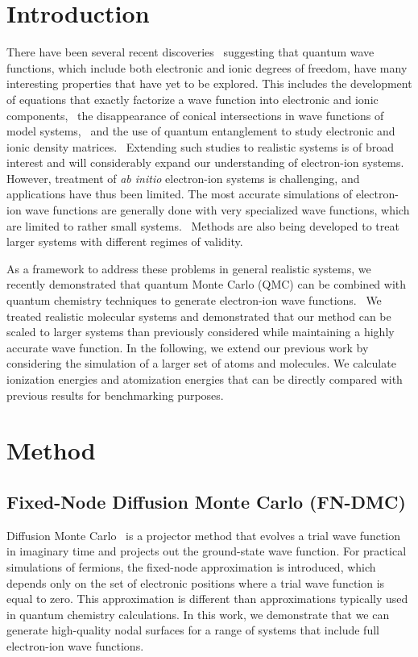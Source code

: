 \section{Introduction}
There have been several recent discoveries~\cite{Tubman_ECG,cederbaum1,gross2014,boent,Martinez_Review} suggesting that quantum wave functions, which include both electronic and ionic degrees of freedom, have many interesting properties that have yet to be explored.  This includes the development of equations that exactly factorize a wave function into electronic and ionic components,~\cite{cederbaum1,cederbaum12} the disappearance of conical intersections in wave functions of model systems,~\cite{gross2014} and the use of quantum entanglement to study electronic and ionic density matrices.~\cite{boent} Extending such studies to realistic systems is of broad interest and will considerably expand our understanding of electron-ion systems. However, treatment of \textit{ab initio} electron-ion systems is challenging, and applications have thus been limited. The most accurate simulations of electron-ion wave functions are generally done with very specialized wave functions, which are limited to rather small systems.~\cite{mitroy2013} Methods are also being developed to treat larger systems with different regimes of validity.~\cite{Sharon_NEO-HF,Sharon_XCNEO-HF1,Sharon_XCNEO-HF2,Sharon_XCNEO-HF,Kurt_XCNEO-HF,Kurt_XCNEO-HF1,Sharon_NEO-DFT,Sharon_NEO-DFT2,Sharon_NEO-DFT3,Gross_NEO-DFT,Gross_NEO-DFT1,Ilkka_Path,Ilkka_Path1,Ilkka_Path2}

As a framework to address these problems in general realistic systems, we recently demonstrated that quantum Monte Carlo (QMC) can be combined with quantum chemistry techniques to generate electron-ion wave functions.~\cite{Tubman_ECG} We treated realistic molecular systems and demonstrated that our method can be scaled to larger systems than previously considered while maintaining a highly accurate wave function. In the following, we extend our previous work by considering the simulation of a larger set of atoms and molecules. We calculate ionization energies and atomization energies that can be directly compared with previous results for benchmarking purposes.

\section{Method}
\subsection{Fixed-Node Diffusion Monte Carlo (FN-DMC)}
Diffusion Monte Carlo~\cite{Anderson_DMC,lester1,Stuart_Review,Needs_Review,Needs_Old_Review,QMC_Review} is a projector method that evolves a trial wave function in imaginary time and projects out the ground-state wave function. For practical simulations of fermions, the fixed-node approximation is introduced, which depends only on the set of electronic positions where a trial wave function is equal to zero.  This approximation is different than approximations typically used in quantum chemistry calculations. In this work, we demonstrate that we can generate high-quality nodal surfaces for a range of systems that include full electron-ion wave functions. 

